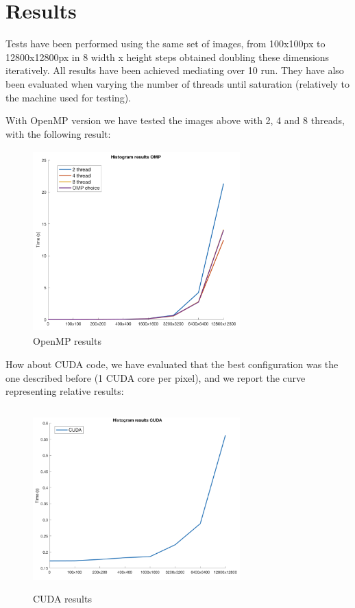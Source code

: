 \documentclass[10pt,twocolumn,letterpaper]{article}
\begin{document}
\section{Results}
Tests have been performed using the same set of images, from 100x100px to 12800x12800px in 8 width x height steps obtained doubling these dimensions iteratively. All results have been achieved mediating over 10 run. They have also been evaluated when varying the number of threads until saturation (relatively to the machine used for testing). 

With OpenMP version we have tested the images above with 2, 4 and 8 threads, with the following result:
\begin{figure}[h]
	\centering
	\includegraphics[width=8cm, height=7cm]{res_OMP}
	\caption{OpenMP results}
	\label{fig:OMP}
\end{figure}

How about CUDA code, we have evaluated that the best configuration was the one described before (1 CUDA core per pixel), and we report the curve representing relative results:
\begin{figure}[h]
	\centering
	\includegraphics[width=8cm, height=7cm]{res_CUDA}
	\caption{CUDA results}
	\label{fig:CUDA}
\end{figure}
\end{document}
